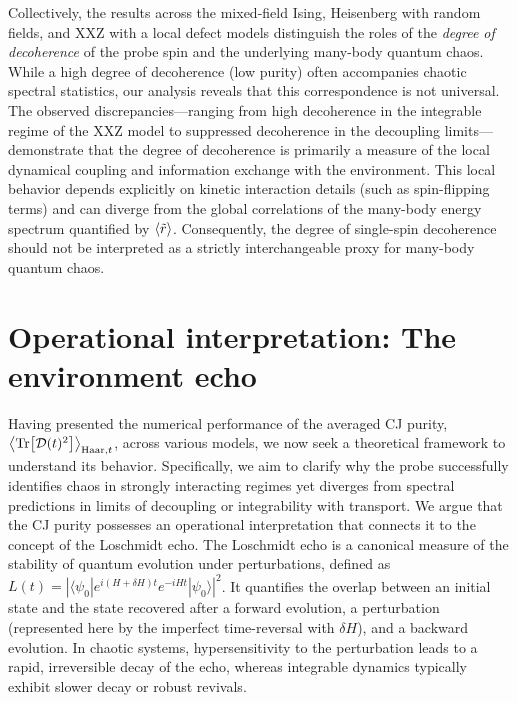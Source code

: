 \documentclass[letterpaper,superscriptaddress,aps,pra,nolongbibliography,showpacs,floatfix,dvipsnames,10pt,twocolumn]{revtex4-2}
\begin{document}
Collectively, the results across the mixed-field Ising, Heisenberg with
random fields, and XXZ with a local defect models distinguish the roles of
the \textit{degree of decoherence} of the probe spin and the underlying
many-body quantum chaos. While a high degree of decoherence (low purity)
often accompanies chaotic spectral statistics, our analysis reveals that
this correspondence is not universal. The observed discrepancies---ranging
from high decoherence in the integrable regime of the XXZ model to
suppressed decoherence in the decoupling limits---demonstrate that the
degree of decoherence is primarily a measure of the local dynamical
coupling and information exchange with the environment. This local
behavior depends explicitly on kinetic interaction details (such as
spin-flipping terms) and can diverge from the global correlations of
the many-body energy spectrum quantified by $\expval{\tilde{r}}$.
Consequently, the degree of single-spin decoherence should not be
interpreted as a strictly interchangeable proxy for many-body quantum chaos.


\section{Operational interpretation: The environment echo}\label{sec:le_interpretation}
Having presented the numerical performance of the averaged CJ
purity, $\expval{\Tr[\mathcal{D}(t)^2]}_{\text{Haar}, t}$, across various
models, we now seek a theoretical framework to understand its
behavior. Specifically, we aim to clarify why the probe successfully
identifies chaos in strongly interacting regimes yet diverges from
spectral predictions in limits of decoupling or integrability with
transport. We argue that the CJ purity possesses an operational
interpretation that connects it to the concept of the Loschmidt
echo. The Loschmidt echo is a canonical measure of the stability of
quantum evolution under perturbations, defined as
$L(t) = |\langle \psi_0 | e^{i (H+\delta H) t} e^{-i H t} | \psi_0 \rangle|^2$.
It quantifies the overlap between an initial state and the state
recovered after a forward evolution, a perturbation (represented
here by the imperfect time-reversal with $\delta H$), and a
backward evolution. In chaotic systems, hypersensitivity to the
perturbation leads to a rapid, irreversible decay of the echo,
whereas integrable dynamics typically exhibit slower decay or
robust revivals.
\end{document}
